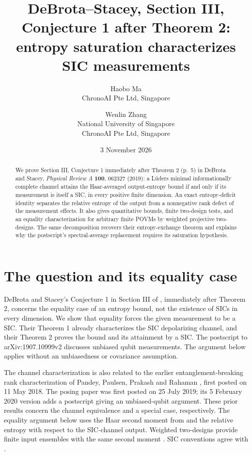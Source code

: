 \documentclass[11pt]{article}
\title{DeBrota--Stacey, Section III,\\Conjecture 1 after Theorem 2:\\entropy saturation characterizes SIC measurements}
\author{Haobo Ma\\\small ChronoAI Pte Ltd, Singapore
\and Wenlin Zhang\\\small National University of Singapore\\\small ChronoAI Pte Ltd, Singapore}
\date{3 November 2026}
\begin{document}
\maketitle
\begin{abstract}
We prove Section III, Conjecture 1 immediately after Theorem 2 (p.~5) in
DeBrota and Stacey, \emph{Physical Review A} \textbf{100}, 062327 (2019):
a L\"uders minimal informationally complete channel attains the
Haar-averaged output-entropy bound if and only if its measurement is
itself a SIC, in every positive finite dimension.
An exact entropy-deficit identity separates the relative entropy of the
output from a nonnegative rank defect of the measurement effects.
It also gives quantitative bounds, finite two-design tests, and an equality
characterization for arbitrary finite POVMs by weighted projective two-designs.
The same decomposition recovers their entropy-exchange theorem and explains
why the postscript's spectral-average replacement requires its saturation hypothesis.
\end{abstract}

\section{The question and its equality case}
DeBrota and Stacey's Conjecture 1 in Section III of \cite{DS}, immediately
after Theorem 2, concerns the equality case of an entropy bound, not the
existence of SICs in every dimension. We show that equality forces the
given measurement to be a SIC. Their Theorem 1 already characterizes the
SIC depolarizing channel, and their Theorem 2 proves the bound and its
attainment by a SIC. The postscript to arXiv:1907.10999v2 discusses
unbiased qubit measurements. The argument below applies without an
unbiasedness or covariance assumption.

The channel characterization is also related to the earlier entanglement-breaking
rank characterization of Pandey, Paulsen, Prakash and Rahaman
\cite[Theorem III.2 and Corollary III.3]{PPPR}, first posted on 11 May 2018.
The posing paper was first posted on 25 July 2019; its 5 February 2020
version adds a postscript giving an unbiased-qubit argument.
These prior results concern the channel equivalence and a special case,
respectively. The equality argument below uses the Haar second moment
from \cite[Lemma 1]{DS} and the relative entropy with respect to the
SIC-channel output. Weighted two-designs provide finite input ensembles
with the same second moment \cite[Section II]{Scott}. SIC conventions
agree with \cite{Renes}.
\end{document}
